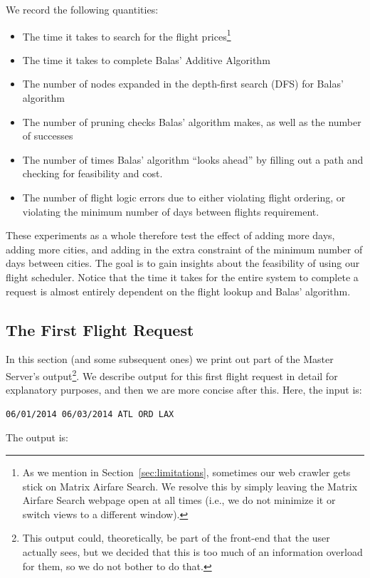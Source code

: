 \documentclass{article}
\begin{document}
We record the following quantities:

\begin{itemize}[noitemsep]
    \item The time it takes to search for the flight prices\footnote{As we mention in Section~\ref{sec:limitations}, sometimes our web crawler gets
    stick on Matrix Airfare Search. We resolve this by simply leaving the Matrix Airfare Search webpage open at all times (i.e., we do not minimize it
    or switch views to a different window).}
    \item The time it takes to complete Balas' Additive Algorithm
    \item The number of nodes expanded in the depth-first search (DFS) for Balas' algorithm
    \item The number of pruning checks Balas' algorithm makes, as well as the number of successes
    \item The number of times Balas' algorithm ``looks ahead'' by filling out a path and checking for feasibility and cost.
    \item The number of flight logic errors due to either violating flight ordering, or violating the minimum number of days between flights
    requirement.
\end{itemize}

These experiments as a whole therefore test the effect of adding more days, adding more cities, and adding in the extra constraint of the minimum
number of days between cities. The goal is to gain insights about the feasibility of using our flight scheduler. Notice that the time it takes for the
entire system to complete a request is almost entirely dependent on the flight lookup and Balas' algorithm.


\subsection{The First Flight Request}\label{app:first_flight_request}

In this section (and some subsequent ones) we print out part of the Master Server's output\footnote{This output could, theoretically, be part of the
front-end that the user actually sees, but we decided that this is too much of an information overload for them, so we do not bother to do that.}.  We
describe output for this first flight request in detail for explanatory purposes, and then we are more concise after this. Here, the input is:

\begin{verbatim}
06/01/2014 06/03/2014 ATL ORD LAX
\end{verbatim}
The output is:
\end{document}
